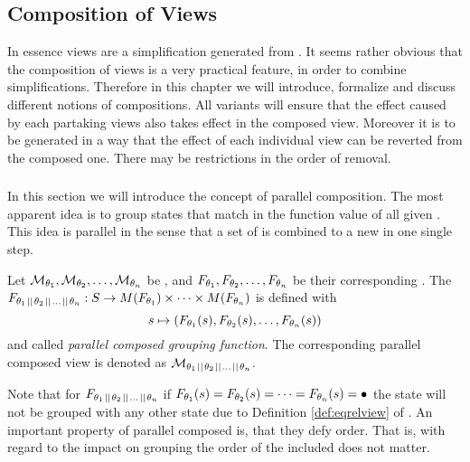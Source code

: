 \documentclass[preview]{standalone}
\begin{document}
\subsection{Composition of Views} \label{ch:composition}
In essence views are a simplification generated from \chgphN. It seems rather obvious that the composition of views is a very practical feature, in order to combine simplifications. Therefore in this chapter we will introduce, formalize and discuss different notions of compositions. All variants will ensure that the effect caused by each partaking views also takes effect in the composed view. Moreover it is to be generated in a way that the effect of each individual view can be reverted from the composed one. There may be restrictions in the order of removal.

\subsubsection{\parllcompNCC} 
In this section we will introduce the concept of parallel composition. The most apparent idea is to group states that match in the function value of all given \grpfctsN. This idea is parallel in the sense that a set of \grpfctN is combined to a new \grpfctN in one single step.

\begin{definition}
	Let $\view[\viewppty_1], \view[\viewppty_2], \dots, \view[\viewppty_n]$ be \viewsN, and $\grpfct[\viewppty_1], \grpfct[\viewppty_2], \dots, \grpfct[\viewppty_n]$ be their corresponding \grpfctsN. The \grpfctN $\grpfct[{\viewppty_1 \pll \viewppty_2 \pll \dots \pll \viewppty_n}]: \states \to \arbset(\grpfct[\viewppty_1]) \times \dots \times \arbset(\grpfct[\viewppty_n])$ is defined with
	\[
	\state \mapsto (\grpfct[\viewppty_1](\state), \grpfct[\viewppty_2](\state), \dots, \grpfct[\viewppty_n](\state))
	\] 
	and called \emph{parallel composed grouping function}.
	The corresponding parallel composed view is denoted as $\view[\viewppty_1 \pll \viewppty_2 \pll \dots \pll \viewppty_n]$.
\end{definition}

Note that for $\grpfct[{\viewppty_1 \pll \viewppty_2 \pll \dots \pll \viewppty_n}]$ if $\grpfct[\viewppty_1](\state) = \grpfct[\viewppty_2](\state) = \dots = \grpfct[\viewppty_n](\state) = \remelem$ the state \state will not be grouped with any other state due to Definition \ref{def:eqrelview} of \eqrelview. An important property of parallel composed \grpfctsN is, that they defy order. That is, with regard to the impact on grouping the order of the included \grpfctsN does not matter.
\end{document}
